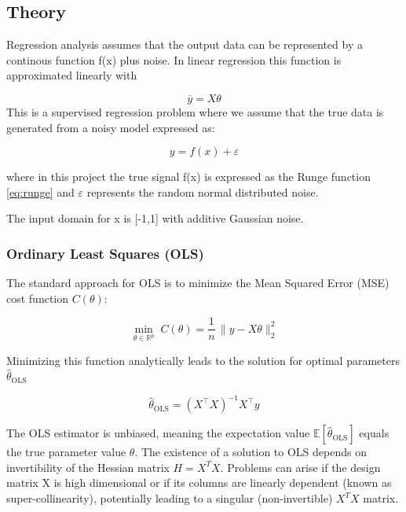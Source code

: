 \documentclass[amssymb,twocolumn,aps]{revtex4-2}
\begin{document}
\subsection{Theory}
\label{subsection:theory}
Regression analysis assumes that the output data can be represented by a continous function f(x) plus noise. In linear regression this function is approximated linearly with 

\begin{equation}
    \overline{y} = X \theta
\end{equation}
This is a supervised regression problem where we assume that the true data is generated from a noisy model expressed as: 

\begin{equation}
y = f(x)+\varepsilon
\end{equation}

where in this project the true signal f(x) is expressed as the Runge function \ref{eq:runge} and $\varepsilon$ represents the random normal distributed noise. 

The input domain for x is [-1,1] with additive Gaussian noise. 
\subsubsection{Ordinary Least Squares (OLS)}
\label{subsubsec:ols_theory}

The standard approach for OLS is to minimize the Mean Squared Error (MSE) cost function $C (\theta)$: 

\begin{equation}
    \min_{\theta\in\mathbb{R}^p} \; C(\theta)
= \frac{1}{n}\,\lVert y - X\theta \rVert_2^2
\end{equation}

Minimizing this function analytically leads to the solution for optimal parameters $\hat{\theta}_{\text{OLS}}$

\begin{equation}
\hat{\theta}_{\text{OLS}} = (X^\top X)^{-1} X^\top y
\end{equation}

The OLS estimator is unbiased, meaning the expectation value $\mathbb{E}\!\left[\hat{\theta}_{\text{OLS}}\right]$ equals the true parameter value $\theta$. The existence of a solution to OLS depends on invertibility of the Hessian matrix $H=X^TX$. Problems can arise if the design matrix X is high dimensional or if its columns are linearly dependent (known as super-collinearity), potentially leading to a singular (non-invertible) $X^TX$ matrix. \\
\end{document}
